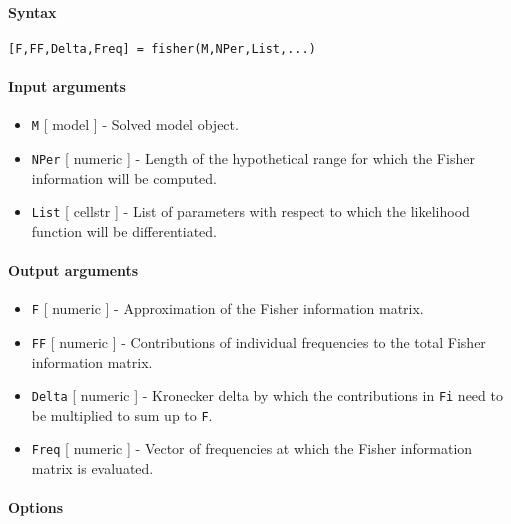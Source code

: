 


	\paragraph{Syntax}

\begin{verbatim}
[F,FF,Delta,Freq] = fisher(M,NPer,List,...)
\end{verbatim}

\paragraph{Input arguments}

\begin{itemize}
\item
  \texttt{M} {[} model {]} - Solved model object.
\item
  \texttt{NPer} {[} numeric {]} - Length of the hypothetical range for
  which the Fisher information will be computed.
\item
  \texttt{List} {[} cellstr {]} - List of parameters with respect to
  which the likelihood function will be differentiated.
\end{itemize}

\paragraph{Output arguments}

\begin{itemize}
\item
  \texttt{F} {[} numeric {]} - Approximation of the Fisher information
  matrix.
\item
  \texttt{FF} {[} numeric {]} - Contributions of individual frequencies
  to the total Fisher information matrix.
\item
  \texttt{Delta} {[} numeric {]} - Kronecker delta by which the
  contributions in \texttt{Fi} need to be multiplied to sum up to
  \texttt{F}.
\item
  \texttt{Freq} {[} numeric {]} - Vector of frequencies at which the
  Fisher information matrix is evaluated.
\end{itemize}

\paragraph{Options}

